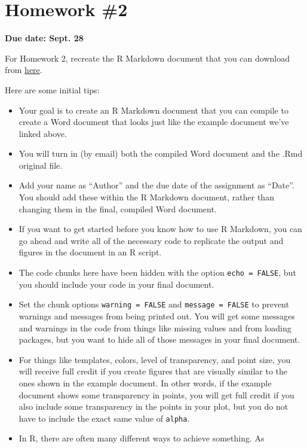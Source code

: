 \documentclass[]{book}
\providecommand{\tightlist}{%
  \setlength{\itemsep}{0pt}\setlength{\parskip}{0pt}}
\begin{document}
\section{Homework \#2}\label{homework-2}

\textbf{Due date: Sept. 28}

For Homework 2, recreate the R Markdown document that you can download
from
\href{https://github.com/geanders/RProgrammingForResearch/raw/master/Homework/Homework_2.docx}{here}.

Here are some initial tips:

\begin{itemize}
\tightlist
\item
  Your goal is to create an R Markdown document that you can compile to
  create a Word document that looks just like the example document we've
  linked above.
\item
  You will turn in (by email) both the compiled Word document and the
  .Rmd original file.
\item
  Add your name as ``Author'' and the due date of the assignment as
  ``Date''. You should add these within the R Markdown document, rather
  than changing them in the final, compiled Word document.
\item
  If you want to get started before you know how to use R Markdown, you
  can go ahead and write all of the necessary code to replicate the
  output and figures in the document in an R script.
\item
  The code chunks here have been hidden with the option
  \texttt{echo\ =\ FALSE}, but you should include your code in your
  final document.
\item
  Set the chunk options \texttt{warning\ =\ FALSE} and
  \texttt{message\ =\ FALSE} to prevent warnings and messages from being
  printed out. You will get some messages and warnings in the code from
  things like missing values and from loading packages, but you want to
  hide all of those messages in your final document.
\item
  For things like templates, colors, level of transparency, and point
  size, you will receive full credit if you create figures that are
  visually similar to the ones shown in the example document. In other
  words, if the example document shows some transparency in points, you
  will get full credit if you also include some transparency in the
  points in your plot, but you do not have to include the exact same
  value of \texttt{alpha}.
\item
  In R, there are often many different ways to achieve something. As

\end{itemize}
\end{document}

